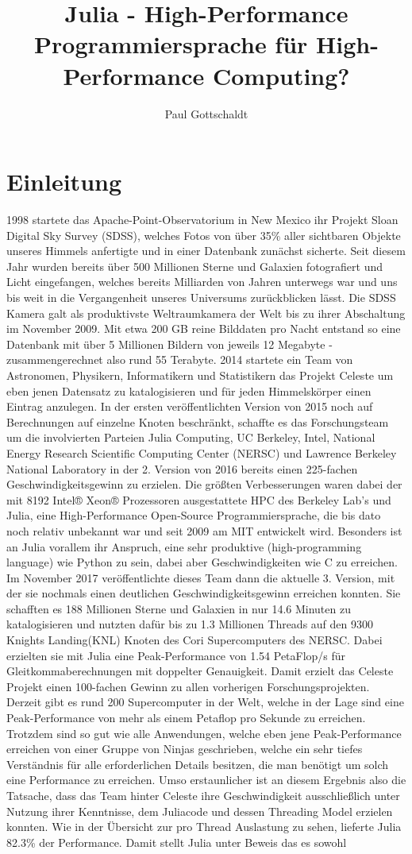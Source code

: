 \documentclass[proseminar,german,utf8]{zihpub}
\author{Paul Gottschaldt}
\title{Julia - High-Performance Programmiersprache für High-Performance Computing?}
\begin{document}
\section {Einleitung}
1998 startete das Apache-Point-Observatorium in New Mexico ihr Projekt Sloan Digital Sky Survey (SDSS), welches Fotos von über 35\% aller sichtbaren Objekte unseres Himmels anfertigte und in einer Datenbank zunächst sicherte. Seit diesem Jahr wurden bereits über 500 Millionen Sterne und Galaxien fotografiert und Licht eingefangen, welches bereits Milliarden von Jahren unterwegs war und uns bis weit in die Vergangenheit unseres Universums zurückblicken lässt. Die SDSS Kamera galt als produktivste Weltraumkamera der Welt bis zu ihrer Abschaltung im November 2009. Mit etwa 200 GB reine Bilddaten pro Nacht entstand so eine Datenbank mit über 5 Millionen Bildern von jeweils 12 Megabyte - zusammengerechnet also rund 55 Terabyte. 2014 startete ein Team von Astronomen, Physikern, Informatikern und Statistikern das Projekt Celeste um eben jenen Datensatz zu katalogisieren und für jeden Himmelskörper einen Eintrag anzulegen. In der ersten veröffentlichten Version von 2015 noch auf Berechnungen auf einzelne Knoten beschränkt, schaffte es das Forschungsteam um die involvierten Parteien Julia Computing, UC Berkeley, Intel, National Energy Research Scientific Computing Center (NERSC) und Lawrence Berkeley National Laboratory in der 2. Version von 2016 bereits einen 225-fachen Geschwindigkeitsgewinn zu erzielen. Die größten Verbesserungen waren dabei der mit 8192 Intel® Xeon® Prozessoren ausgestattete HPC des Berkeley Lab's und Julia, eine High-Performance Open-Source Programmiersprache, die bis dato noch relativ unbekannt war und seit 2009 am MIT entwickelt wird. Besonders ist an Julia vorallem ihr Anspruch, eine sehr produktive (high-programming language) wie Python zu sein, dabei aber Geschwindigkeiten wie C zu erreichen. Im November 2017 veröffentlichte dieses Team dann die aktuelle 3. Version, mit der sie nochmals einen deutlichen Geschwindigkeitsgewinn erreichen konnten. Sie schafften es 188 Millionen Sterne und Galaxien in nur 14.6 Minuten zu katalogisieren und nutzten dafür bis zu 1.3 Millionen Threads auf den 9300 Knights Landing(KNL) Knoten des Cori Supercomputers des NERSC. Dabei erzielten sie mit Julia eine Peak-Performance von 1.54 PetaFlop/s für Gleitkommaberechnungen mit doppelter Genauigkeit. Damit erzielt das Celeste Projekt einen 100-fachen Gewinn zu allen vorherigen Forschungsprojekten. Derzeit gibt es rund 200 Supercomputer in der Welt, welche in der Lage sind eine Peak-Performance von mehr als einem Petaflop pro Sekunde zu erreichen. Trotzdem sind so gut wie alle Anwendungen, welche eben jene Peak-Performance erreichen von einer Gruppe von Ninjas geschrieben, welche ein sehr tiefes Verständnis für alle erforderlichen Details besitzen, die man benötigt um solch eine Performance zu erreichen. Umso erstaunlicher ist an diesem Ergebnis also die Tatsache, dass das Team hinter Celeste ihre Geschwindigkeit ausschließlich unter Nutzung ihrer Kenntnisse, dem Juliacode und dessen Threading Model erzielen konnten. Wie in der Übersicht zur pro Thread Auslastung zu sehen, lieferte Julia 82.3\% der Performance. Damit stellt Julia unter Beweis das es sowohl 
\end{document}
